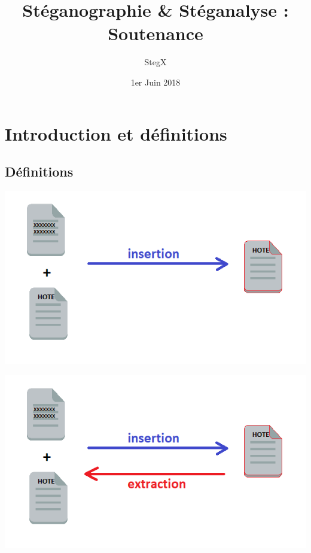 \documentclass{beamer}
\title{Stéganographie \& Stéganalyse : Soutenance}
\author{StegX}
\institute{UFR des Sciences Versailles - L3 Informatique}
\date{1er Juin 2018}
\begin{document}
  \begin{frame}
  \titlepage
  \end{frame}
  
  \section{Introduction et définitions}
    
  \subsection{Définitions}
  
  \begin{frame}
  \hspace{5cm}
  \includegraphics[scale=0.7]{pictures/definition1.png}
  \end{frame}
  
  \begin{frame}
  \hspace{5cm}
  \includegraphics[scale=0.7]{pictures/definition2.png}
  \end{frame}
  
\end{document}
